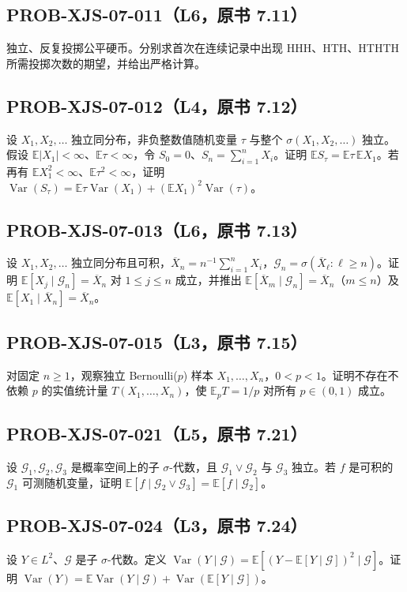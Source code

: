 \documentclass[UTF8]{ctexart}
\begin{document}
\subsection*{PROB-XJS-07-011（L6，原书 7.11）}
独立、反复投掷公平硬币。分别求首次在连续记录中出现 HHH、HTH、HTHTH 所需投掷次数的期望，并给出严格计算。

\subsection*{PROB-XJS-07-012（L4，原书 7.12）}
设 $X_1,X_2,\ldots$ 独立同分布，非负整数值随机变量 $\tau$ 与整个 $\sigma(X_1,X_2,\ldots)$ 独立。假设 $\mathbb E|X_1|<\infty$、$\mathbb E\tau<\infty$，令 $S_0=0$、$S_n=\sum_{i=1}^nX_i$。证明 $\mathbb ES_\tau=\mathbb E\tau\,\mathbb EX_1$。若再有 $\mathbb EX_1^2<\infty$、$\mathbb E\tau^2<\infty$，证明 $\operatorname{Var}(S_\tau)=\mathbb E\tau\operatorname{Var}(X_1)+(\mathbb EX_1)^2\operatorname{Var}(\tau)$。

\subsection*{PROB-XJS-07-013（L6，原书 7.13）}
设 $X_1,X_2,\ldots$ 独立同分布且可积，$\overline X_n=n^{-1}\sum_{i=1}^nX_i$，$\mathcal G_n=\sigma(\overline X_\ell:\ell\ge n)$。证明 $\mathbb E[X_j\mid\mathcal G_n]=\overline X_n$ 对 $1\le j\le n$ 成立，并推出 $\mathbb E[\overline X_m\mid\mathcal G_n]=\overline X_n$（$m\le n$）及 $\mathbb E[X_1\mid\overline X_n]=\overline X_n$。

\subsection*{PROB-XJS-07-015（L3，原书 7.15）}
对固定 $n\ge1$，观察独立 Bernoulli($p$) 样本 $X_1,\ldots,X_n$，$0<p<1$。证明不存在不依赖 $p$ 的实值统计量 $T(X_1,\ldots,X_n)$，使 $\mathbb E_pT=1/p$ 对所有 $p\in(0,1)$ 成立。

\subsection*{PROB-XJS-07-021（L5，原书 7.21）}
设 $\mathcal G_1,\mathcal G_2,\mathcal G_3$ 是概率空间上的子 $\sigma$-代数，且 $\mathcal G_1\vee\mathcal G_2$ 与 $\mathcal G_3$ 独立。若 $f$ 是可积的 $\mathcal G_1$ 可测随机变量，证明 $\mathbb E[f\mid\mathcal G_2\vee\mathcal G_3]=\mathbb E[f\mid\mathcal G_2]$。

\subsection*{PROB-XJS-07-024（L3，原书 7.24）}
设 $Y\in L^2$、$\mathcal G$ 是子 $\sigma$-代数。定义 $\operatorname{Var}(Y\mid\mathcal G)=\mathbb E[(Y-\mathbb E[Y\mid\mathcal G])^2\mid\mathcal G]$。证明 $\operatorname{Var}(Y)=\mathbb E\operatorname{Var}(Y\mid\mathcal G)+\operatorname{Var}(\mathbb E[Y\mid\mathcal G])$。
\end{document}
